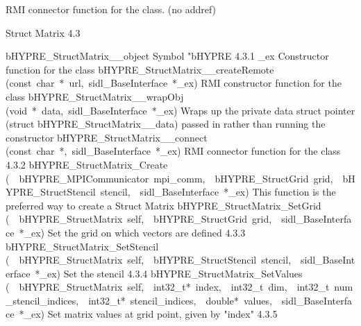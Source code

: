 \documentclass{article}
\begin{document}
\begin{cxxentry}
\begin{cxxentry}
\begin{cxxvariable}
\begin{cxxdoc}
RMI connector function for the class. (no addref)
\end{cxxdoc}
\end{cxxvariable}
\end{cxxentry}
\begin{cxxentry}
{}
        {Struct Matrix}
        {}
        {
}
        {4.3}
\begin{cxxnames}
        {bHYPRE\_StructMatrix\_\_object}
        {}
        {
Symbol "bHYPRE}
        {4.3.1}
        {\_ex}
        {}
        {
Constructor function for the class}
        {}
\label{cxx.4.3.14}
        {bHYPRE\_StructMatrix\_\_createRemote}
        {(const\ char\ *\ url,\ sidl\_BaseInterface\ *\_ex)}
        {
RMI constructor function for the class}
        {}
\label{cxx.4.3.15}
        {bHYPRE\_StructMatrix\_\_wrapObj}
        {(void\ *\ data,\ sidl\_BaseInterface\ *\_ex)}
        {
Wraps up the private data struct pointer (struct bHYPRE\_StructMatrix\_\_data) passed in rather than running the constructor}
        {}
\label{cxx.4.3.16}
        {bHYPRE\_StructMatrix\_\_connect}
        {(const\ char\ *,\ sidl\_BaseInterface\ *\_ex)}
        {
RMI connector function for the class}
        {4.3.2}
        {bHYPRE\_StructMatrix\_Create}
        {(\ \ bHYPRE\_MPICommunicator\ mpi\_comm,\ \ bHYPRE\_StructGrid\ grid,\ \ bHYPRE\_StructStencil\ stencil,\ \ sidl\_BaseInterface\ *\_ex)}
        {
This function is the preferred way to create a Struct Matrix}
        {}
\label{cxx.4.3.17}
        {bHYPRE\_StructMatrix\_SetGrid}
        {(\ \ bHYPRE\_StructMatrix\ self,\ \ bHYPRE\_StructGrid\ grid,\ \ sidl\_BaseInterface\ *\_ex)}
        {
Set the grid on which vectors are defined}
        {4.3.3}
        {bHYPRE\_StructMatrix\_SetStencil}
        {(\ \ bHYPRE\_StructMatrix\ self,\ \ bHYPRE\_StructStencil\ stencil,\ \ sidl\_BaseInterface\ *\_ex)}
        {
Set the stencil}
        {4.3.4}
        {bHYPRE\_StructMatrix\_SetValues}
        {(\ \ bHYPRE\_StructMatrix\ self,\ \ int32\_t*\ index,\ \ int32\_t\ dim,\ \ int32\_t\ num\_stencil\_indices,\ \ int32\_t*\ stencil\_indices,\ \ double*\ values,\ \ sidl\_BaseInterface\ *\_ex)}
        {
Set matrix values at grid point, given by "index"}
        {4.3.5}

\end{cxxnames}
\end{cxxentry}
\end{cxxentry}
\end{document}
